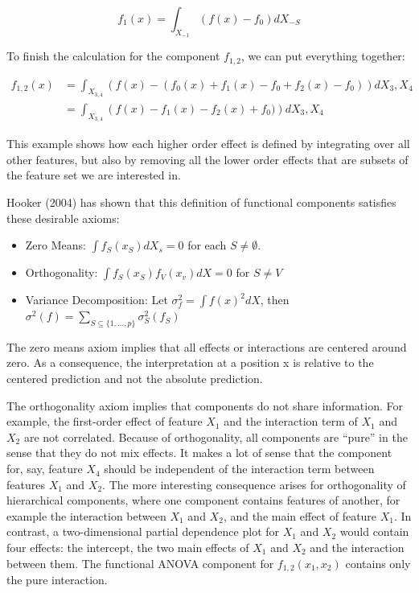 \documentclass[
  12pt,
]{krantz}
\providecommand{\tightlist}{%
  \setlength{\itemsep}{0pt}\setlength{\parskip}{0pt}}
\begin{document}
\[f_1(x) = \int_{X_{-1}} \left( f(x) - f_0\right) d X_{-S}\]

To finish the calculation for the component \(f_{1,2}\), we can put everything together:

\begin{align*}f_{1,2}(x) &= \int_{X_{3,4}} \left( f(x) - (f_0(x) + f_1(x) - f_0 + f_2(x) - f_0)\right) d X_{3},X_4 \\  &= \int_{X_{3,4}} \left(f(x) - f_1(x) - f_2(x) + f_0)\right) d X_{3},X_4 \end{align*}

This example shows how each higher order effect is defined by integrating over all other features, but also by removing all the lower order effects that are subsets of the feature set we are interested in.

Hooker (2004) has shown that this definition of functional components satisfies these desirable axioms:

\begin{itemize}
\tightlist
\item
  Zero Means: \(\int{}f_S(x_S)dX_s=0\) for each \(S\neq\emptyset\).
\item
  Orthogonality: \(\int{}f_S(x_S)f_V(x_v)dX=0\) for \(S\neq{}V\)
\item
  Variance Decomposition: Let \(\sigma^2_{f}=\int{}f(x)^2dX\), then \(\sigma^2(f) = \sum_{S \subseteq \{1,\ldots,p\}} \sigma^2_S(f_S)\)
\end{itemize}

The zero means axiom implies that all effects or interactions are centered around zero.
As a consequence, the interpretation at a position x is relative to the centered prediction and not the absolute prediction.

The orthogonality axiom implies that components do not share information.
For example, the first-order effect of feature \(X_1\) and the interaction term of \(X_{1}\) and \(X_2\) are not correlated.
Because of orthogonality, all components are ``pure'' in the sense that they do not mix effects.
It makes a lot of sense that the component for, say, feature \(X_4\) should be independent of the interaction term between features \(X_1\) and \(X_2\).
The more interesting consequence arises for orthogonality of hierarchical components, where one component contains features of another, for example the interaction between \(X_1\) and \(X_2\), and the main effect of feature \(X_1\).
In contrast, a two-dimensional partial dependence plot for \(X_1\) and \(X_2\) would contain four effects: the intercept, the two main effects of \(X_1\) and \(X_2\) and the interaction between them.
The functional ANOVA component for \(f_{1,2}(x_1,x_2)\) contains only the pure interaction.
\end{document}
